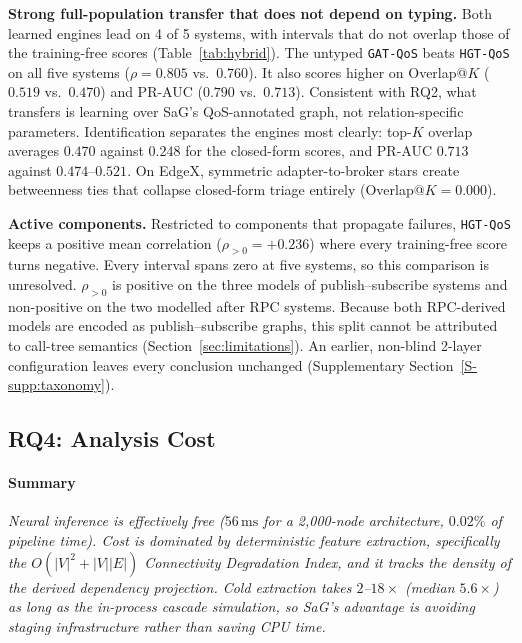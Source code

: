 \documentclass[preprint,3p]{elsarticle}
\begin{document}
\noindent\textbf{Strong full-population transfer that does not depend on typing.} Both learned engines lead on 4 of 5 systems, with intervals that do not overlap those of the training-free scores (Table~\ref{tab:hybrid}). The untyped \texttt{GAT-QoS} beats \texttt{HGT-QoS} on all five systems ($\rho = 0.805$ vs.\ $0.760$). It also scores higher on Overlap@$K$ ($0.519$ vs.\ $0.470$) and PR-AUC ($0.790$ vs.\ $0.713$). Consistent with RQ2, what transfers is learning over SaG's QoS-annotated graph, not relation-specific parameters. Identification separates the engines most clearly: top-$K$ overlap averages $0.470$ against $0.248$ for the closed-form scores, and PR-AUC $0.713$ against $0.474$--$0.521$. On EdgeX, symmetric adapter-to-broker stars create betweenness ties that collapse closed-form triage entirely (Overlap@$K = 0.000$).

\noindent\textbf{Active components.} Restricted to components that propagate failures, \texttt{HGT-QoS} keeps a positive mean correlation ($\rho_{>0} = +0.236$) where every training-free score turns negative. Every interval spans zero at five systems, so this comparison is unresolved. $\rho_{>0}$ is positive on the three models of publish--subscribe systems and non-positive on the two modelled after RPC systems. Because both RPC-derived models are encoded as publish--subscribe graphs, this split cannot be attributed to call-tree semantics (Section~\ref{sec:limitations}). An earlier, non-blind 2-layer configuration leaves every conclusion unchanged (Supplementary Section~\ref{S-supp:taxonomy}).

\subsection{RQ4: Analysis Cost}
\label{sec:rq4}

\paragraph{Summary} \emph{Neural inference is effectively free ($56\,\text{ms}$ for a 2{,}000-node architecture, $0.02\%$ of pipeline time). Cost is dominated by deterministic feature extraction, specifically the $O(|V|^2 + |V||E|)$ Connectivity Degradation Index, and it tracks the density of the derived dependency projection. Cold extraction takes $2$--$18\times$ (median $5.6\times$) as long as the in-process cascade simulation, so SaG's advantage is avoiding staging infrastructure rather than saving CPU time.}
\end{document}

